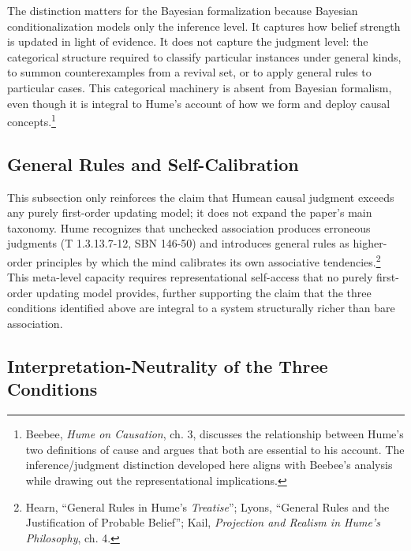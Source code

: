 \documentclass[11pt]{article}
\begin{document}
The distinction matters for the Bayesian formalization because Bayesian conditionalization models only the inference level. It captures how belief strength is updated in light of evidence. It does not capture the judgment level: the categorical structure required to classify particular instances under general kinds, to summon counterexamples from a revival set, or to apply general rules to particular cases. This categorical machinery is absent from Bayesian formalism, even though it is integral to Hume's account of how we form and deploy causal concepts.\footnote{Beebee, \emph{Hume on Causation}, ch. 3, discusses the relationship between Hume's two definitions of cause and argues that both are essential to his account. The inference/judgment distinction developed here aligns with Beebee's analysis while drawing out the representational implications.}

\subsection{General Rules and Self-Calibration}

This subsection only reinforces the claim that Humean causal judgment exceeds any purely first-order updating model; it does not expand the paper's main taxonomy. Hume recognizes that unchecked association produces erroneous judgments (T 1.3.13.7-12, SBN 146-50) and introduces general rules as higher-order principles by which the mind calibrates its own associative tendencies.\footnote{Hearn, ``General Rules in Hume's \emph{Treatise}''; Lyons, ``General Rules and the Justification of Probable Belief''; Kail, \emph{Projection and Realism in Hume's Philosophy}, ch. 4.} This meta-level capacity requires representational self-access that no purely first-order updating model provides, further supporting the claim that the three conditions identified above are integral to a system structurally richer than bare association.

\subsection{Interpretation-Neutrality of the Three Conditions}
\end{document}
